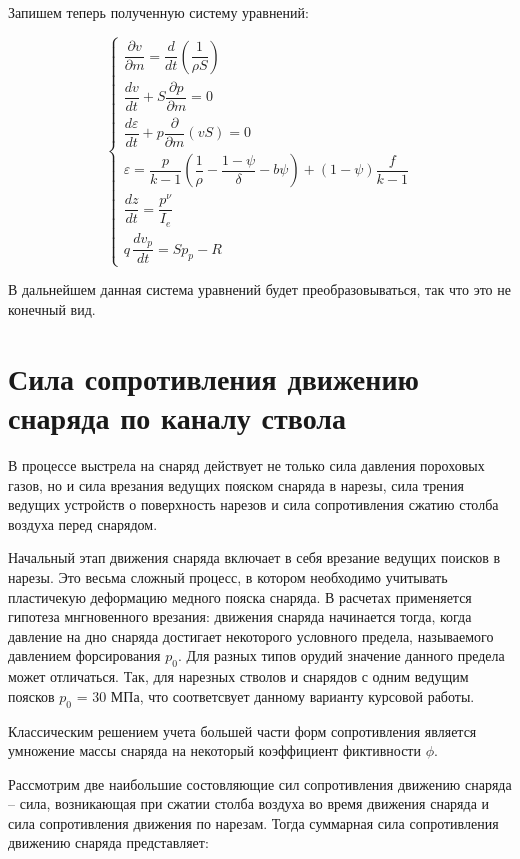 \documentclass[14pt, a4paper]{extreport} %
\begin{document}
Запишем теперь полученную систему уравнений: 

\[
\left\{
\begin{array}{l}
\dfrac{\partial v}{\partial m} = \dfrac{d}{dt}\left(\dfrac{1}{\rho S}\right) \\[1.5ex]
\dfrac{dv}{dt} + S\dfrac{\partial p}{\partial m} = 0 \\[1.5ex]
\dfrac{d\varepsilon}{dt} + p\dfrac{\partial}{\partial m}(vS) = 0 \\[1.5ex]
\varepsilon = \dfrac{p}{k - 1} \left( \dfrac{1}{\rho} - \dfrac{1 - \psi}{\delta} - b \psi \right) + (1 - \psi) \dfrac{f}{k - 1} \\[1.5ex]
\dfrac{dz}{dt} = \dfrac{p^\nu}{I_e} \\[1.5ex]
q \, \dfrac{d v_{p}}{d t} = S p_{p} - R
\end{array}
\right.
\]

В дальнейшем данная система уравнений будет преобразовываться, так что это не конечный вид.

\section{Сила сопротивления движению снаряда по каналу ствола}

В процессе выстрела на снаряд действует не только сила давления пороховых газов, но и сила врезания ведущих пояском снаряда в нарезы, сила трения ведущих устройств о поверхность нарезов и сила сопротивления сжатию столба воздуха перед снарядом. 

Начальный этап движения снаряда включает в себя врезание ведущих поисков в нарезы. Это весьма сложный процесс, в котором необходимо учитывать пластичекую деформацию медного пояска снаряда. В расчетах применяется гипотеза мнгновенного врезания: движения снаряда начинается тогда, когда давление на дно снаряда достигает 
некоторого условного предела, называемого давлением форсирования $p_0$. Для разных типов орудий значение данного предела может отличаться. Так, для нарезных стволов и снарядов с одним ведущим поясков $p_0$ = 30 МПа, что соответсвует данному варианту курсовой работы.

Классическим решением учета большей части форм сопротивления является умножение массы снаряда на некоторый коэффициент фиктивности $\phi$.

Рассмотрим две наибольшие состовляющие сил сопротивления движению снаряда -- сила, возникающая при сжатии столба воздуха во время движения снаряда и сила сопротивления движения по нарезам. Тогда суммарная сила сопротивления
движению снаряда представляет: 
\end{document}
